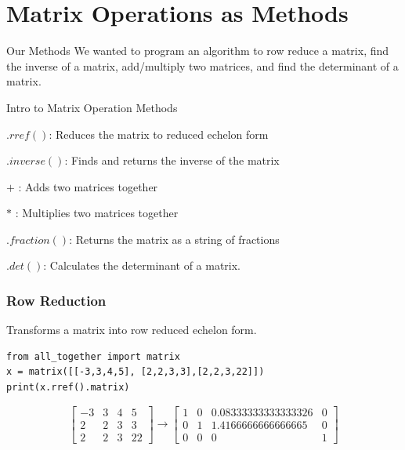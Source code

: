 \documentclass{beamer}
\begin{document}
\section{Matrix Operations as Methods}
\begin{frame}{Our Methods}
We wanted to program an algorithm to row reduce a matrix, find the inverse of a matrix, add/multiply two matrices, and find the determinant of a matrix.
\end{frame}
\begin{frame}{Intro to Matrix Operation Methods}
    \begin{center}
        $.rref()$: Reduces the matrix to reduced echelon form
        
        $.inverse()$: Finds and returns the inverse of the matrix

        $+$ : Adds two matrices together

        $*$ : Multiplies two matrices together

        $.fraction()$: Returns the matrix as a string of fractions

        \(.det()\): Calculates the determinant of a matrix. 
    \end{center}
\end{frame}

\begin{frame}[fragile=singleslide]\frametitle{Row Reduction}
Transforms a matrix into row reduced echelon form.
\begin{verbatim}
from all_together import matrix
x = matrix([[-3,3,4,5], [2,2,3,3],[2,2,3,22]])
print(x.rref().matrix) 
\end{verbatim}
\begin{equation*}
\left[
\begin{array}{cccc}
    -3 & 3 & 4 &5   \\
     2&2&3&3 \\
     2&2&3&22
\end{array}
\right]
\rightarrow
\left[
\begin{array}{cccc}
    1 & 0 & 0.08333333333333326 &0   \\
     0&1& 1.4166666666666665&0 \\
     0&0&0&1
\end{array}
\right]
\end{equation*}
\end{frame}
\end{document}
